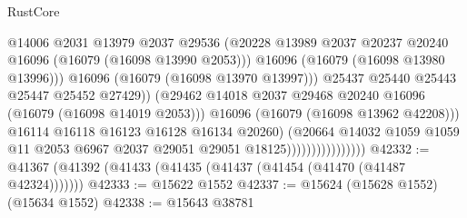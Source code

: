 \begin{lexlean}{RustCore}
\begin{coremodule}
                                              @14006
                                              @2031
                                              @13979
                                              @2037
                                              @29536
                                              (@20228
                                                @13989
                                                @2037
                                                @20237
                                                @20240
                                                @16096
                                                (@16079 (@16098 @13990 @2053)))
                                              @16096
                                              (@16079 (@16098 @13980 @13996)))
                                            @16096
                                            (@16079 (@16098 @13970 @13997)))
                                          @25437
                                          @25440
                                          @25443
                                          @25447
                                          @25452
                                          @27429))
                                      (@29462
                                        @14018
                                        @2037
                                        @29468
                                        @20240
                                        @16096
                                        (@16079 (@16098 @14019 @2053)))
                                      @16096
                                      (@16079 (@16098 @13962 @42208)))
                                    @16114
                                    @16118
                                    @16123
                                    @16128
                                    @16134
                                    @20260)
                                  (@20664
                                    @14032
                                    @1059
                                    @1059
                                    @11
                                    @2053
                                    @6967
                                    @2037
                                    @29051
                                    @29051
                                    @18125))))))))))))))))
@42332 := @41367 (@41392 (@41433 (@41435 (@41437 (@41454 (@41470 (@41487 @42324)))))))
@42333 := @15622 @1552
@42337 := @15624 (@15628 @1552) (@15634 @1552)
@42338 := @15643 @38781

\end{coremodule}
\end{lexlean}
